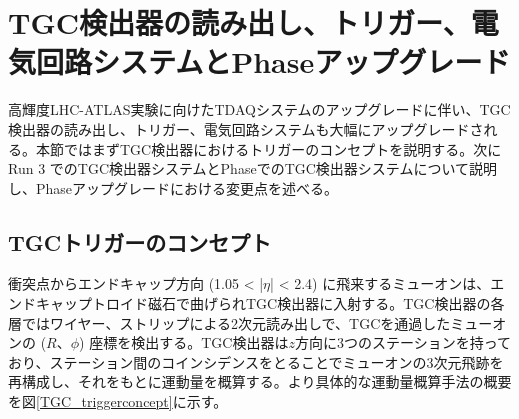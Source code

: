 \section{TGC検出器の読み出し、トリガー、電気回路システムとPhase\two アップグレード}
\label{sec_TGCtrigger}
高輝度LHC-ATLAS実験に向けたTDAQシステムのアップグレードに伴い、TGC検出器の読み出し、トリガー、電気回路システムも大幅にアップグレードされる。本節ではまずTGC検出器におけるトリガーのコンセプトを説明する。次にRun 3 でのTGC検出器システムとPhase\two でのTGC検出器システムについて説明し、Phase\two アップグレードにおける変更点を述べる。

    \subsection{TGCトリガーのコンセプト}
    \label{subsec_trigger_concept}
衝突点からエンドキャップ方向  (1.05 < |$\eta$| < 2.4) に飛来するミューオンは、エンドキャップトロイド磁石で曲げられTGC検出器に入射する。TGC検出器の各層ではワイヤー、ストリップによる2次元読み出しで、TGCを通過したミューオンの  ($R$、$\phi$) 座標を検出する。TGC検出器は$z$方向に3つのステーションを持っており、ステーション間のコインシデンスをとることでミューオンの3次元飛跡を再構成し、それをもとに運動量を概算する。より具体的な運動量概算手法の概要を図\ref{TGC_triggerconcept}に示す。

